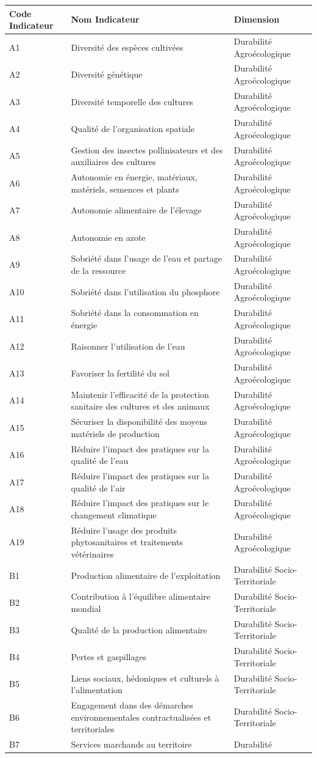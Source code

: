 \documentclass[]{article}
\begin{document}
\begin{longtable}[]{@{}lll@{}}
\toprule
Code Indicateur & Nom Indicateur & Dimension\tabularnewline
\midrule
\endhead
A1 & Diversité des espèces cultivées & Durabilité
Agroécologique\tabularnewline
A2 & Diversité génétique & Durabilité Agroécologique\tabularnewline
A3 & Diversité temporelle des cultures & Durabilité
Agroécologique\tabularnewline
A4 & Qualité de l'organisation spatiale & Durabilité
Agroécologique\tabularnewline
A5 & Gestion des insectes pollinisateurs et des auxiliaires des cultures
& Durabilité Agroécologique\tabularnewline
A6 & Autonomie en énergie, matériaux, matériels, semences et plants &
Durabilité Agroécologique\tabularnewline
A7 & Autonomie alimentaire de l'élevage & Durabilité
Agroécologique\tabularnewline
A8 & Autonomie en azote & Durabilité Agroécologique\tabularnewline
A9 & Sobriété dans l'usage de l'eau et partage de la ressource &
Durabilité Agroécologique\tabularnewline
A10 & Sobriété dans l'utilisation du phosphore & Durabilité
Agroécologique\tabularnewline
A11 & Sobriété dans la consommation en énergie & Durabilité
Agroécologique\tabularnewline
A12 & Raisonner l'utilisation de l'eau & Durabilité
Agroécologique\tabularnewline
A13 & Favoriser la fertilité du sol & Durabilité
Agroécologique\tabularnewline
A14 & Maintenir l'efficacité de la protection sanitaire des cultures et
des animaux & Durabilité Agroécologique\tabularnewline
A15 & Sécuriser la disponibilité des moyens matériels de production &
Durabilité Agroécologique\tabularnewline
A16 & Réduire l'impact des pratiques sur la qualité de l'eau &
Durabilité Agroécologique\tabularnewline
A17 & Réduire l'impact des pratiques sur la qualité de l'air &
Durabilité Agroécologique\tabularnewline
A18 & Réduire l'impact des pratiques sur le changement climatique &
Durabilité Agroécologique\tabularnewline
A19 & Réduire l'usage des produits phytosanitaires et traitements
vétérinaires & Durabilité Agroécologique\tabularnewline
B1 & Production alimentaire de l'exploitation & Durabilité
Socio-Territoriale\tabularnewline
B2 & Contribution à l'équilibre alimentaire mondial & Durabilité
Socio-Territoriale\tabularnewline
B3 & Qualité de la production alimentaire & Durabilité
Socio-Territoriale\tabularnewline
B4 & Pertes et gaspillages & Durabilité
Socio-Territoriale\tabularnewline
B5 & Liens sociaux, hédoniques et culturels à l'alimentation &
Durabilité Socio-Territoriale\tabularnewline
B6 & Engagement dans des démarches environnementales contractualisées et
territoriales & Durabilité Socio-Territoriale\tabularnewline
B7 & Services marchands au territoire & Durabilité

\end{longtable}
\end{document}
